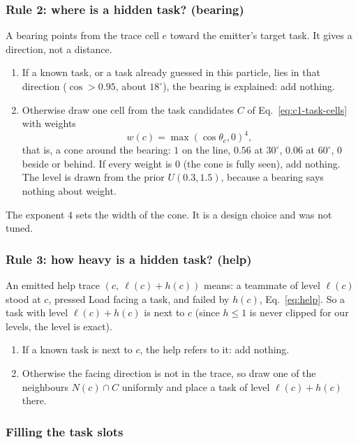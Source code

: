 \documentclass[11pt,a4paper]{article}
\theoremstyle{remark}
\begin{document}
\subsubsection{Rule 2: where is a hidden task? (bearing)}

A bearing points from the trace cell $e$ toward the emitter's target task. It gives a direction, not a distance.
\begin{enumerate}[nosep]
  \item If a known task, or a task already guessed in this particle, lies in that direction ($\cos > 0.95$, about
        $18^\circ$), the bearing is explained: add nothing.
  \item Otherwise draw one cell from the task candidates $C$ of Eq.~\eqref{eq:c1-task-cells} with weights
        \begin{equation}
          w(c) = \max(\cos\theta_c, 0)^{4},
          \label{eq:rule2}
        \end{equation}
        that is, a cone around the bearing: $1$ on the line, $0.56$ at $30^\circ$, $0.06$ at $60^\circ$, $0$ beside or
        behind. If every weight is $0$ (the cone is fully seen), add nothing. The level is drawn from the prior
        $U(0.3,1.5)$, because a bearing says nothing about weight.
\end{enumerate}
The exponent $4$ sets the width of the cone. It is a design choice and was not tuned.

\subsubsection{Rule 3: how heavy is a hidden task? (help)}

An emitted help trace $(c,\ \ell(c)+h(c))$ means: a teammate of level $\ell(c)$ stood at $c$, pressed Load facing a task,
and failed by $h(c)$, Eq.~\eqref{eq:help}. So a task with level $\ell(c)+h(c)$ is next to $c$ (since $h\le1$ is never
clipped for our levels, the level is exact).
\begin{enumerate}[nosep]
  \item If a known task is next to $c$, the help refers to it: add nothing.
  \item Otherwise the facing direction is not in the trace, so draw one of the neighbours $N(c)\cap C$ uniformly and
        place a task of level $\ell(c)+h(c)$ there.
\end{enumerate}

\subsubsection{Filling the task slots}
\end{document}
